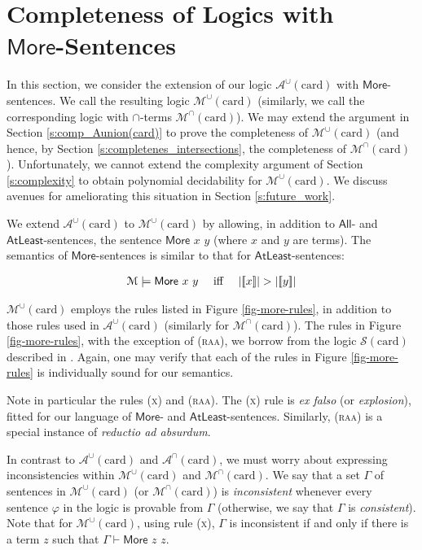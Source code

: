 \documentclass[letterpaper]{article} %
\theoremstyle{definition}
\newcommand{\semantics}[1]{[\![\mbox{\em $ #1 $\/}]\!]}
\newcommand{\Model}{\mathcal{M}}
\newcommand{\proves}{\vdash}
\newcommand{\Aunion}{\mathscr{A}^{\cup}}
\newcommand{\Munion}{\mathscr{M}^{\cup}}
\newcommand{\Ainter}{\mathscr{A}^{\cap}}
\newcommand{\Minter}{\mathscr{M}^{\cap}}
\newcommand{\proverule}{\textsc}
\newcommand{\x}{\proverule{x}}
\newcommand{\raa}{\proverule{raa}}
\newcommand{\More}[2]{\mathsf{More}\,\,#1\,\,#2}
\newcommand{\AllNoArgs}{\mathsf{All}}
\newcommand{\AtleastNoArgs}{\mathsf{AtLeast}}
\newcommand{\MoreNoArgs}{\mathsf{More}}
\newcommand{\card}{\mathrm{card}}
\begin{document}
\section{Completeness of Logics with \\$\MoreNoArgs$-Sentences}\label{s:completeness-more}

In this section, we consider the extension of our logic $\Aunion(\card)$ with $\MoreNoArgs$-sentences.  We call the resulting logic $\Munion(\card)$ (similarly, we call the corresponding logic with $\cap$-terms $\Minter(\card)$).  We may extend the argument in Section \ref{s:comp_Aunion(card)} to prove the completeness of $\Munion(\card)$ (and hence, by Section \ref{s:completenes_intersections}, the completeness of $\Minter(\card)$).  Unfortunately, we cannot extend the complexity argument of Section \ref{s:complexity} to obtain polynomial decidability for $\Munion(\card)$.  We discuss avenues for ameliorating this situation in Section \ref{s:future_work}.

We extend $\Aunion(\card)$ to $\Munion(\card)$ by allowing, in addition to $\AllNoArgs$- and $\AtleastNoArgs$-sentences, the sentence $\More{x}{y}$ (where $x$ and $y$ are terms).  The semantics of $\MoreNoArgs$-sentences is similar to that for $\AtleastNoArgs$-sentences:

\[
\begin{array}{lclcl}
    \Model \models \More{x}{y} & \textrm{ iff } & 
        |\semantics{x}| > |\semantics{y}|
\end{array}
\] 



$\Munion(\card)$ employs the rules listed in Figure \ref{fig-more-rules}, in addition to those rules used in $\Aunion(\card)$ (similarly for $\Minter(\card)$).  The rules in Figure \ref{fig-more-rules}, with the exception of (\raa), we borrow from the logic $\mathscr{S}(\card)$ described in \cite{syllogistic_cardinality_comparisons}.  Again, one may verify that each of the rules in Figure \ref{fig-more-rules} is individually sound for our semantics.

Note in particular the rules (\x) and (\raa).  The (\x) rule is \emph{ex falso} (or \emph{explosion}), fitted for our language of $\MoreNoArgs$- and $\AtleastNoArgs$-sentences.  Similarly, (\raa) is a special instance of \emph{reductio ad absurdum}.

In contrast to $\Aunion(\card)$ and $\Ainter(\card)$, we must worry about expressing inconsistencies within $\Munion(\card)$ and $\Minter(\card)$.  We say that a set $\Gamma$ of sentences in $\Munion(\card)$ (or $\Minter(\card)$) is \emph{inconsistent} whenever every sentence $\varphi$ in the logic is provable from $\Gamma$ (otherwise, we say that $\Gamma$ is \emph{consistent}).  Note that for $\Munion(\card)$, using rule (\x), $\Gamma$ is inconsistent if and only if there is a term $z$ such that $\Gamma \proves \More{z}{z}$.
\end{document}
